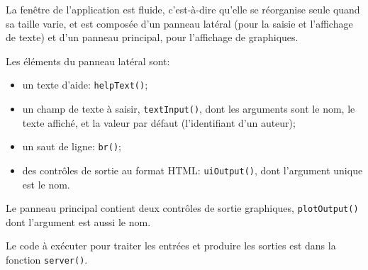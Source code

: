 \documentclass[
  11pt,
  french,
  a4paper,
  extrafontsizes,onecolumn,openright
  ]{memoir}
\providecommand{\tightlist}{%
  \setlength{\itemsep}{0pt}\setlength{\parskip}{0pt}}
\begin{document}
\normalsize

La fenêtre de l'application est fluide, c'est-à-dire qu'elle se réorganise seule quand sa taille varie, et est composée d'un panneau latéral (pour la saisie et l'affichage de texte) et d'un panneau principal, pour l'affichage de graphiques.

Les éléments du panneau latéral sont:

\begin{itemize}
\tightlist
\item
  un texte d'aide: \texttt{helpText()};
\item
  un champ de texte à saisir, \texttt{textInput()}, dont les arguments sont le nom, le texte affiché, et la valeur par défaut (l'identifiant d'un auteur);
\item
  un saut de ligne: \texttt{br()};
\item
  des contrôles de sortie au format HTML: \texttt{uiOutput()}, dont l'argument unique est le nom.
\end{itemize}

Le panneau principal contient deux contrôles de sortie graphiques, \texttt{plotOutput()} dont l'argument est aussi le nom.

Le code à exécuter pour traiter les entrées et produire les sorties est dans la fonction \texttt{server()}.

\scriptsize
\end{document}
